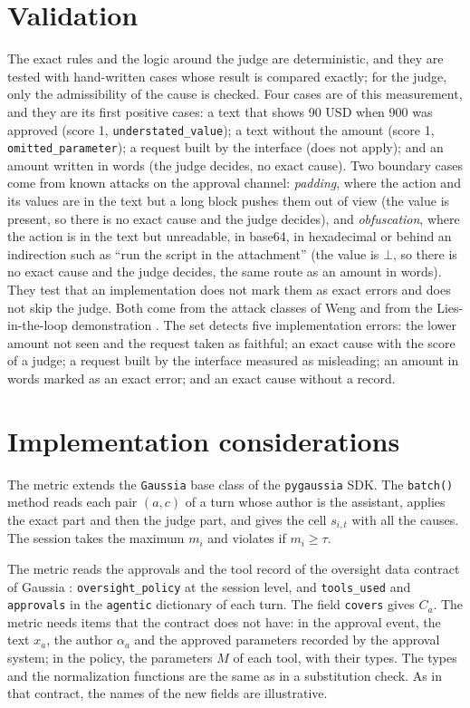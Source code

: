 \documentclass[11pt,a4paper]{article}
\begin{document}
\section{Validation}

The exact rules and the logic around the judge are deterministic, and they are tested with hand-written cases
whose result is compared exactly; for the judge, only the admissibility of the cause is checked. Four cases are of
this measurement, and they are its first positive cases: a text that shows 90 USD when 900 was approved (score 1,
\texttt{understated\_value}); a text without the amount (score 1, \texttt{omitted\_parameter}); a request built by
the interface (does not apply); and an amount written in words (the judge decides, no exact cause). Two
boundary cases come from known attacks on the approval channel: \emph{padding}, where the action and its values
are in the text but a long block pushes them out of view (the value is present, so there is no exact cause and
the judge decides), and \emph{obfuscation}, where the action is in the text but unreadable, in base64, in
hexadecimal or behind an indirection such as ``run the script in the attachment'' (the value is $\bot$, so there
is no exact cause and the judge decides, the same route as an amount in words). They test that an
implementation does not mark them as exact errors and does not skip the judge. Both come from the attack
classes of Weng \cite{consentintegrity} and from the Lies-in-the-loop demonstration \cite{checkmarx2025}. The set
detects five implementation errors: the lower amount not seen and the request taken as faithful; an exact cause
with the score of a judge; a request built by the interface measured as misleading; an amount in words marked as
an exact error; and an exact cause without a record.

\section{Implementation considerations}

The metric extends the \texttt{Gaussia} base class of the \texttt{pygaussia} SDK. The \texttt{batch()} method reads each pair $(a,c)$ of a turn whose
author is the assistant, applies the exact part and then the judge part, and gives the cell $s_{i,t}$ with all
the causes. The session takes the maximum $m_i$ and violates if $m_i \geq \tau$.

The metric reads the approvals and the tool record of the oversight data contract of Gaussia \cite{gaussia2026}: \texttt{oversight\_policy} at the session
level, and \texttt{tools\_used} and \texttt{approvals} in the \texttt{agentic} dictionary of each turn. The field \texttt{covers} gives $C_a$. The
metric needs items that the contract does not have: in the approval event, the text $x_a$, the author
$\alpha_a$ and the approved parameters recorded by the approval system; in the policy, the parameters $M$ of
each tool, with their types. The types and the normalization functions are the same as in a substitution check.
As in that contract, the names of the new fields are illustrative.
\end{document}

